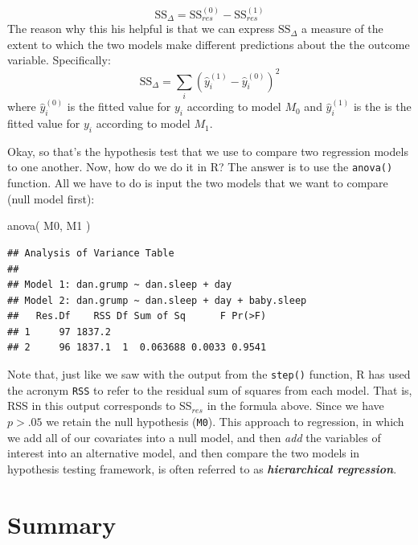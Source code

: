 \documentclass[
]{book}
\newenvironment{Shaded}{\begin{snugshade}}{\end{snugshade}}
\newcommand{\FunctionTok}[1]{\textcolor[rgb]{0.00,0.00,0.00}{#1}}
\newcommand{\NormalTok}[1]{#1}
\begin{document}
\[
\mbox{SS}_\Delta = \mbox{SS}_{res}^{(0)} - \mbox{SS}_{res}^{(1)}
\]
The reason why this his helpful is that we can express \(\mbox{SS}_\Delta\) a measure of the extent to which the two models make different predictions about the the outcome variable. Specifically:
\[
\mbox{SS}_\Delta  = \sum_{i} \left( \hat{y}_i^{(1)} - \hat{y}_i^{(0)} \right)^2
\]
where \(\hat{y}_i^{(0)}\) is the fitted value for \(y_i\) according to model \(M_0\) and \(\hat{y}_i^{(1)}\) is the is the fitted value for \(y_i\) according to model \(M_1\).

Okay, so that's the hypothesis test that we use to compare two regression models to one another. Now, how do we do it in R? The answer is to use the \texttt{anova()} function. All we have to do is input the two models that we want to compare (null model first):

\begin{Shaded}
\begin{Highlighting}[]
\FunctionTok{anova}\NormalTok{( M0, M1 )}
\end{Highlighting}
\end{Shaded}

\begin{verbatim}
## Analysis of Variance Table
## 
## Model 1: dan.grump ~ dan.sleep + day
## Model 2: dan.grump ~ dan.sleep + day + baby.sleep
##   Res.Df    RSS Df Sum of Sq      F Pr(>F)
## 1     97 1837.2                           
## 2     96 1837.1  1  0.063688 0.0033 0.9541
\end{verbatim}

Note that, just like we saw with the output from the \texttt{step()} function, R has used the acronym \texttt{RSS} to refer to the residual sum of squares from each model. That is, RSS in this output corresponds to SS\(_{res}\) in the formula above. Since we have \(p>.05\) we retain the null hypothesis (\texttt{M0}). This approach to regression, in which we add all of our covariates into a null model, and then \emph{add} the variables of interest into an alternative model, and then compare the two models in hypothesis testing framework, is often referred to as \textbf{\emph{hierarchical regression}}.

\hypertarget{summary-5}{%
\section{Summary}\label{summary-5}}
\end{document}

